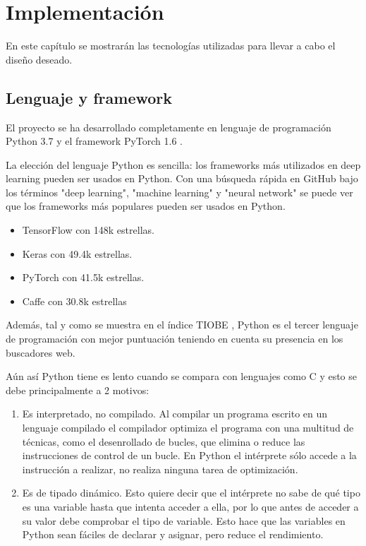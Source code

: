 \chapter{Implementación}\label{implementacion}

En este capítulo se mostrarán las tecnologías utilizadas para llevar a cabo el diseño deseado.

\section{Lenguaje y framework}\label{sec:language_framework}

El proyecto se ha desarrollado completamente en lenguaje de programación Python 3.7 y el framework PyTorch 1.6 \cite{Paszke2019}.

La elección del lenguaje Python es sencilla: los frameworks más utilizados en deep learning pueden ser usados en Python. Con una búsqueda rápida en GitHub bajo los términos "deep learning", "machine learning" y "neural network" se puede ver que los frameworks más populares pueden ser usados en Python.
\begin{itemize}
\item TensorFlow con 148k estrellas.
\item Keras con 49.4k estrellas.
\item PyTorch con 41.5k estrellas.
\item Caffe con 30.8k estrellas
\end{itemize}

Además, tal y como se muestra en el índice TIOBE \cite{Tiobe2020}, Python es el tercer lenguaje de programación con mejor puntuación teniendo en cuenta su presencia en los buscadores web.

Aún así Python tiene es lento cuando se compara con lenguajes como C y esto se debe principalmente a 2 motivos:
\begin{enumerate}
\item Es interpretado, no compilado. Al compilar un programa escrito en un lenguaje compilado el compilador optimiza el programa con una multitud de técnicas, como el desenrollado de bucles, que elimina o reduce las instrucciones de control de un bucle. En Python el intérprete sólo accede a la instrucción a realizar, no realiza ninguna tarea de optimización.
\item Es de tipado dinámico. Esto quiere decir que el intérprete no sabe de qué tipo es una variable hasta que intenta acceder a ella, por lo que antes de acceder a su valor debe comprobar el tipo de variable. Esto hace que las variables en Python sean fáciles de declarar y asignar, pero reduce el rendimiento.
\end{enumerate}

